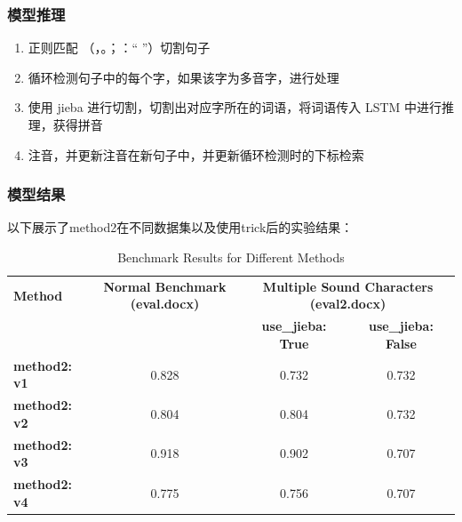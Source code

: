 \documentclass[12pt,hyperref,a4paper,UTF8]{ctexart}
\begin{document}
\subsubsection{模型推理}
\begin{enumerate}
  \item 正则匹配 （，。；：“ ”）切割句子
  \item 循环检测句子中的每个字，如果该字为多音字，进行处理
  \item 使用 jieba 进行切割，切割出对应字所在的词语，将词语传入 LSTM 中进行推理，获得拼音
  \item 注音，并更新注音在新句子中，并更新循环检测时的下标检索
\end{enumerate}
\subsubsection{模型结果}
以下展示了method2在不同数据集以及使用trick后的实验结果：
\begin{table}[h!]
\centering
\caption{Benchmark Results for Different Methods}
\begin{tabular}{@{}lccc@{}}
\toprule
\textbf{Method} & \textbf{Normal Benchmark (eval.docx)} & \multicolumn{2}{c}{\textbf{Multiple Sound Characters (eval2.docx)}} \\ 
\cmidrule(r){3-4}
  & & \textbf{use\_jieba: True} & \textbf{use\_jieba: False} \\ 
\midrule
\textbf{method2: v1} & 0.828 & 0.732 & 0.732 \\ 
\textbf{method2: v2} & 0.804 & 0.804 & 0.732 \\ 
\textbf{method2: v3} & \cellcolor[HTML]{FFCCCC}0.918 & \cellcolor[HTML]{FFCCCC}0.902 & 0.707 \\ 
\textbf{method2: v4} & 0.775 & 0.756 & 0.707 \\ 
\bottomrule
\end{tabular}
\end{table}
\end{document}
